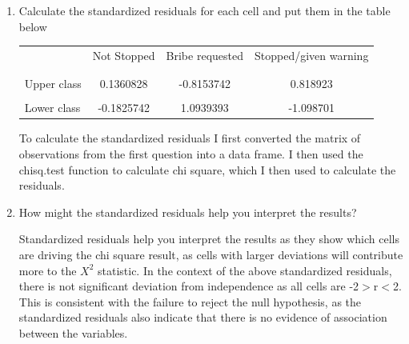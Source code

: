 \documentclass[12pt,letterpaper]{article}
\begin{document}
\begin{enumerate}
	\item [(c)] Calculate the standardized residuals for each cell and put them in the table below 
	\vspace{1cm}
	
	\begin{table}[h]
		\centering
		\begin{tabular}{l | c c c }
			& Not Stopped & Bribe requested & Stopped/given warning \\
			\\[-1.8ex] 
			\hline \\[-1.8ex]
			Upper class & 0.1360828 & -0.8153742 & 0.818923 \\
			\\
			Lower class & -0.1825742 & 1.0939393 & -1.098701 \\
			
		\end{tabular}
	\end{table}
	
	\noindent To calculate the standardized residuals I first converted the matrix of observations from the first question into a data frame. I then used the chisq.test function to calculate chi square, which I then used to calculate the residuals. \\
	
	  
	
	  
	
	
	
	  

	\item [(d)] How might the standardized residuals help you interpret the results?  
	
	\noindent Standardized residuals help you interpret the results as they show which cells are driving the chi square result, as cells with larger deviations will contribute more to the  $X^2$ statistic. In the context of the above standardized residuals, there is not significant deviation from independence as all cells are -2$>$r$<$2. This is consistent with the failure to reject the null hypothesis, as the standardized residuals also indicate that there is no evidence of association between the variables. \\
	
\end{enumerate}
\end{document}
